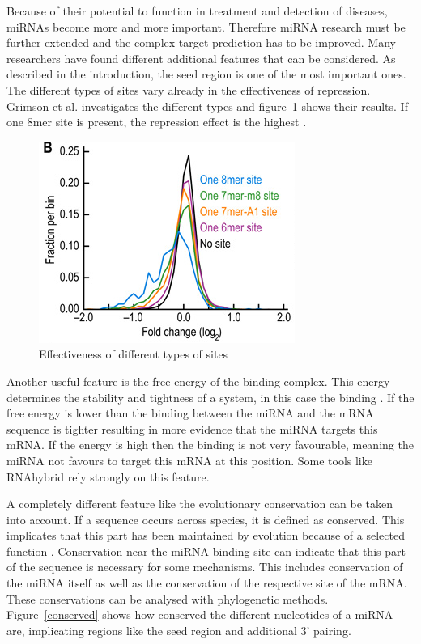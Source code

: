 \documentclass[12pt]{article}
\begin{document}
Because of their potential to function in treatment and detection of diseases, miRNAs become more and more important. Therefore miRNA research must be further extended and the complex target prediction has to be improved. Many researchers have found different additional features that can be considered. As described in the introduction, the seed region is one of the most important ones. The different types of sites vary already in the effectiveness of repression. Grimson et al. investigates the different types and figure~\ref{types} shows their results. If one 8mer site is present, the repression effect is the highest \cite{Grimson}.


\begin{figure}[h]
\centering
\includegraphics[scale=0.6]{results/site_3addi.png}
\caption{Effectiveness of different types of sites}
\label{types}
\end{figure}

Another useful feature is the free energy of the binding complex. This energy determines the stability and tightness of a  system, in this case the binding \cite{Peterson}. If the free energy is lower than the binding between the miRNA and the mRNA sequence is tighter resulting in more evidence that the miRNA targets this mRNA. If the energy is high then the binding is not very favourable, meaning the miRNA not favours to target this mRNA at this position. Some tools like RNAhybrid \cite{Rehmsmeier} rely strongly on this feature. 

A completely different feature like the evolutionary conservation can be taken into account. If a sequence occurs across species, it is defined as conserved. This implicates that this part has been maintained by evolution because of a selected function \cite{Peterson}. Conservation near the miRNA binding site can indicate that this part of the sequence is necessary for some mechanisms. This includes conservation of the miRNA itself as well as the conservation of the respective site of the mRNA. These conservations can be analysed with phylogenetic methods. Figure~\ref{conserved} shows how conserved the different nucleotides of a miRNA are, implicating regions like the seed region and additional 3' pairing. 
\end{document}
